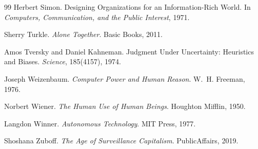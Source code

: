 \documentclass[12pt, a4paper]{article}
\theoremstyle{remark}
\begin{document}
\begin{thebibliography}{99}
Herbert Simon.
Designing Organizations for an Information-Rich World.
In \textit{Computers, Communication, and the Public Interest}, 1971.

Sherry Turkle.
\textit{Alone Together}.
Basic Books, 2011.

Amos Tversky and Daniel Kahneman.
Judgment Under Uncertainty: Heuristics and Biases.
\textit{Science}, 185(4157), 1974.

Joseph Weizenbaum.
\textit{Computer Power and Human Reason}.
W.~H. Freeman, 1976.

Norbert Wiener.
\textit{The Human Use of Human Beings}.
Houghton Mifflin, 1950.

Langdon Winner.
\textit{Autonomous Technology}.
MIT Press, 1977.

Shoshana Zuboff.
\textit{The Age of Surveillance Capitalism}.
PublicAffairs, 2019.

\end{thebibliography}
\end{document}
